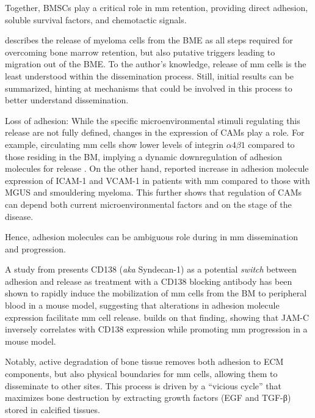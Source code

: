 Together, BMSCs play a critical role in \ac{mm} retention, providing direct
adhesion, soluble survival factors, and chemotactic signals.


%
\label{sec:intro_myeloma_release}%
\citet{zeissigTumourDisseminationMultiple2020} describes the release of myeloma
cells from the BME as all steps required for overcoming bone marrow retention,
but also putative triggers leading to migration out of the BME. To the author's
knowledge, release of \ac{mm} cells is the least understood within the dissemination
process. Still, initial results can be summarized, hinting at mechanisms that
could be involved in this process to better understand dissemination.

Loss of adhesion: While the specific microenvironmental stimuli regulating
this release are not fully defined, changes in the expression of CAMs play a
role. For example, circulating \ac{mm} cells show lower levels of integrin
$\alpha4\beta1$ compared to those residing in the BM, implying a dynamic
downregulation of adhesion molecules for release
\cite{paivaDetailedCharacterizationMultiple2013,
    paivaCompetitionClonalPlasma2011}. On the other hand,
\citet{terposIncreasedCirculatingVCAM12016} reported increase in adhesion
molecule expression of ICAM-1 and VCAM-1 in patients with \ac{mm} compared to those
with MGUS and smouldering myeloma. This further shows that regulation of CAMs
can depend both current microenvironmental factors and on the stage of the
disease.

Hence, adhesion molecules
can be ambiguous role during in \ac{mm} dissemination
and progression.

A study from \citet{akhmetzyanovaDynamicCD138Surface2020} presents CD138
(\textit{aka} Syndecan-1) as a potential \textit{switch} between adhesion and
release as treatment with a CD138 blocking antibody has been shown to rapidly
induce the mobilization of \ac{mm} cells from the BM to peripheral blood in a mouse
model, suggesting that alterations in adhesion molecule expression facilitate \ac{mm}
cell release. \citet{brandlJunctionalAdhesionMolecule2022} builds on that
finding, showing that JAM-C inversely correlates with CD138 expression while
promoting \ac{mm} progression in a mouse model.



Notably, active degradation of bone tissue removes both adhesion to ECM
components, but also physical boundaries for \ac{mm}
cells, allowing them to disseminate to other sites.
This process is driven by a
``vicious cycle'' that maximizes bone destruction by extracting growth factors
(EGF and TGF-β) stored in calcified tissues.



